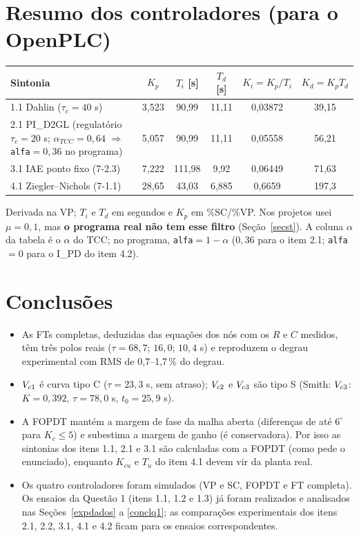 \section{Resumo dos controladores (para o OpenPLC)}
\begin{center}\small
\begin{tabular}{lccccc}\toprule Sintonia & $K_p$ & $T_i$ [s] & $T_d$ [s] & $K_i=K_p/T_i$ & $K_d=K_pT_d$\\\midrule
1.1 Dahlin ($\tau_c=40$ s) & 3,523 & 90,99 & 11,11 & 0,03872 & 39,15\\
2.1 PI\_D2GL (regulatório $\tau_c=20$ s; $\alpha_{TCC}=0{,}64$ $\Rightarrow$ \texttt{alfa}$=0{,}36$ no programa) & 5,057 & 90,99 & 11,11 & 0,05558 & 56,21\\
3.1 IAE ponto fixo (7-2.3) & 7,222 & 111,98 & 9,92 & 0,06449 & 71,63\\
4.1 Ziegler--Nichols (7-1.1) & 28,65 & 43,03 & 6,885 & 0,6659 & 197,3\\\bottomrule\end{tabular}\end{center}
Derivada na VP; $T_i$ e $T_d$ em segundos e $K_p$ em \%SC/\%VP. Nos projetos usei $\mu=0{,}1$, mas \textbf{o programa real não tem esse filtro} (Seção~\ref{secst}). A coluna $\alpha$ da tabela é o $\alpha$ do TCC; no programa, \texttt{alfa}$=1-\alpha$ ($0{,}36$ para o item 2.1; \texttt{alfa}$=0$ para o I\_PD do item 4.2).

\section{Conclusões}
\begin{itemize}
\item As FTs completas, deduzidas das equações dos nós com os $R$ e $C$ medidos, têm três polos reais ($\tau=68{,}7$; $16{,}0$; $10{,}4$ s) e reproduzem o degrau experimental com RMS de 0,7--1,7\,\% do degrau.
\item $V_{c1}$ é curva tipo C ($\tau=23{,}3$ s, sem atraso); $V_{c2}$ e $V_{c3}$ são tipo S (Smith: $V_{c3}$: $K=0{,}392$, $\tau=78{,}0$ s, $t_0=25{,}9$ s).
\item A FOPDT mantém a margem de fase da malha aberta (diferenças de até $6^\circ$ para $K_c\le5$) e subestima a margem de ganho (é conservadora). Por isso as sintonias dos itens 1.1, 2.1 e 3.1 são calculadas com a FOPDT (como pede o enunciado), enquanto $K_{cu}$ e $T_u$ do item 4.1 devem vir da planta real.
\item Os quatro controladores foram simulados (VP e SC, FOPDT e FT completa). Os ensaios da Questão 1 (itens 1.1, 1.2 e 1.3) já foram realizados e analisados nas Seções~\ref{expdados} a \ref{conclq1}; as comparações experimentais dos itens 2.1, 2.2, 3.1, 4.1 e 4.2 ficam para os ensaios correspondentes.
\end{itemize}
